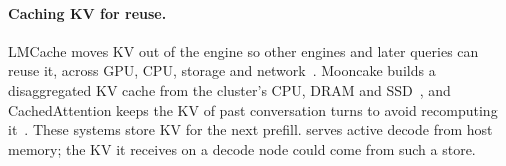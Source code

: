 \paragraph{Caching KV for reuse.} LMCache moves KV out of the engine so other
engines and later queries can reuse it, across GPU, CPU, storage and
network~\cite{lmcache}. Mooncake builds a disaggregated KV cache from the
cluster's CPU, DRAM and SSD~\cite{mooncake}, and CachedAttention keeps the KV
of past conversation turns to avoid recomputing it~\cite{cachedattention}.
These systems store KV for the next prefill. \sysname{} serves active decode
from host memory; the KV it receives on a decode node could come from such a
store.
